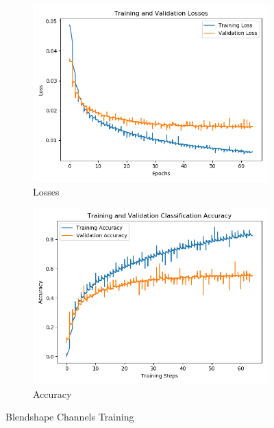 \begin{figure}[h!]
    \centering
    \begin{subfigure}[b]{0.49\textwidth}
        \includegraphics[width=\textwidth]{figures/classification/blendshape_channel_loss.png}
        \caption{Losses}\label{fig:blendshape_channel_loss}
    \end{subfigure}
    \begin{subfigure}[b]{0.49\textwidth}
        \includegraphics[width=\textwidth]{figures/classification/blendshape_channel_acc.png}
        \caption{Accuracy}\label{fig:blendshape_channel_acc}
    \end{subfigure}
    \caption{Blendshape Channels Training}\label{fig:channels_training}
\end{figure}

